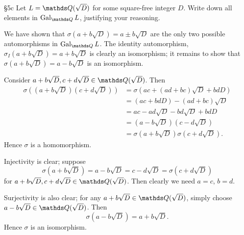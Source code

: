 \documentclass{homework}
\begin{document}
\begin{problem}{\S 5c}
  Let $L=\Q(\sqrt{D})$ for some square-free integer $D$. Write down all elements in $\Gal_{\Q}L$,
  justifying your reasoning.
\end{problem}

\begin{solution}
  We have shown that $\sigma(a+b\sqrt{D})=a\pm b\sqrt{D}$ are the only two possible automorphisms in
  $\Gal_{\Q}L$. The identity automorphism, $\sigma_I(a+b\sqrt{D})=a+b\sqrt{D}$ is clearly an
  isomorphism; it remains to show that $\sigma(a+b\sqrt{D})=a-b\sqrt{D}$ is an isomorphism.

  Consider $a+b\sqrt{D},c+d\sqrt{D}\in \Q(\sqrt{D})$. Then
  \begin{align*}
    \sigma((a+b\sqrt{D})(c+d\sqrt{D}))&= \sigma(ac+(ad+bc)\sqrt{D}+bdD) \\
                                      &= (ac+bdD)-(ad+bc)\sqrt{D}\\
                                      &=ac-ad\sqrt{D}-bd\sqrt{D}+bdD\\
                                      &=(a-b\sqrt{D})(c-d\sqrt{D})\\
                                      &=\sigma(a+b\sqrt{D})\sigma(c+d\sqrt{D})  
  .\end{align*}
  Hence $\sigma$ is a homomorphism.

  Injectivity is clear; suppose \[
    \sigma(a+b\sqrt{D})=a-b\sqrt{D}=c-d\sqrt{D}=\sigma(c+d\sqrt{D})
  \] for $a+b\sqrt{D}, c+d\sqrt{D}\in \Q(\sqrt{D})$. Then clearly we need $a=c$, $b=d$.

  Surjectivity is also clear; for any $a+b\sqrt{D}\in \Q(\sqrt{D})$, simply choose $a-b\sqrt{D}\in
  \Q(\sqrt{D})$. Then \[
    \sigma(a-b\sqrt{D})=a+b\sqrt{D}
  .\] Hence $\sigma$ is an isomorphism.
\end{solution}
\end{document}
